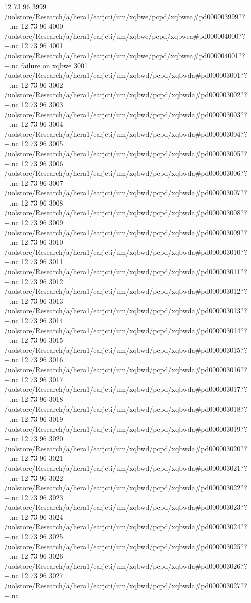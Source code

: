 12 73 96
3999
/uolstore/Research/a/hera1/earjcti/um/xqbwe/pcpd/xqbwea#pd000003999??+.nc
12 73 96
4000
/uolstore/Research/a/hera1/earjcti/um/xqbwe/pcpd/xqbwea#pd000004000??+.nc
12 73 96
4001
/uolstore/Research/a/hera1/earjcti/um/xqbwe/pcpd/xqbwea#pd000004001??+.nc
failure on xqbwe
3001
/uolstore/Research/a/hera1/earjcti/um/xqbwd/pcpd/xqbwda#pd000003001??+.nc
12 73 96
3002
/uolstore/Research/a/hera1/earjcti/um/xqbwd/pcpd/xqbwda#pd000003002??+.nc
12 73 96
3003
/uolstore/Research/a/hera1/earjcti/um/xqbwd/pcpd/xqbwda#pd000003003??+.nc
12 73 96
3004
/uolstore/Research/a/hera1/earjcti/um/xqbwd/pcpd/xqbwda#pd000003004??+.nc
12 73 96
3005
/uolstore/Research/a/hera1/earjcti/um/xqbwd/pcpd/xqbwda#pd000003005??+.nc
12 73 96
3006
/uolstore/Research/a/hera1/earjcti/um/xqbwd/pcpd/xqbwda#pd000003006??+.nc
12 73 96
3007
/uolstore/Research/a/hera1/earjcti/um/xqbwd/pcpd/xqbwda#pd000003007??+.nc
12 73 96
3008
/uolstore/Research/a/hera1/earjcti/um/xqbwd/pcpd/xqbwda#pd000003008??+.nc
12 73 96
3009
/uolstore/Research/a/hera1/earjcti/um/xqbwd/pcpd/xqbwda#pd000003009??+.nc
12 73 96
3010
/uolstore/Research/a/hera1/earjcti/um/xqbwd/pcpd/xqbwda#pd000003010??+.nc
12 73 96
3011
/uolstore/Research/a/hera1/earjcti/um/xqbwd/pcpd/xqbwda#pd000003011??+.nc
12 73 96
3012
/uolstore/Research/a/hera1/earjcti/um/xqbwd/pcpd/xqbwda#pd000003012??+.nc
12 73 96
3013
/uolstore/Research/a/hera1/earjcti/um/xqbwd/pcpd/xqbwda#pd000003013??+.nc
12 73 96
3014
/uolstore/Research/a/hera1/earjcti/um/xqbwd/pcpd/xqbwda#pd000003014??+.nc
12 73 96
3015
/uolstore/Research/a/hera1/earjcti/um/xqbwd/pcpd/xqbwda#pd000003015??+.nc
12 73 96
3016
/uolstore/Research/a/hera1/earjcti/um/xqbwd/pcpd/xqbwda#pd000003016??+.nc
12 73 96
3017
/uolstore/Research/a/hera1/earjcti/um/xqbwd/pcpd/xqbwda#pd000003017??+.nc
12 73 96
3018
/uolstore/Research/a/hera1/earjcti/um/xqbwd/pcpd/xqbwda#pd000003018??+.nc
12 73 96
3019
/uolstore/Research/a/hera1/earjcti/um/xqbwd/pcpd/xqbwda#pd000003019??+.nc
12 73 96
3020
/uolstore/Research/a/hera1/earjcti/um/xqbwd/pcpd/xqbwda#pd000003020??+.nc
12 73 96
3021
/uolstore/Research/a/hera1/earjcti/um/xqbwd/pcpd/xqbwda#pd000003021??+.nc
12 73 96
3022
/uolstore/Research/a/hera1/earjcti/um/xqbwd/pcpd/xqbwda#pd000003022??+.nc
12 73 96
3023
/uolstore/Research/a/hera1/earjcti/um/xqbwd/pcpd/xqbwda#pd000003023??+.nc
12 73 96
3024
/uolstore/Research/a/hera1/earjcti/um/xqbwd/pcpd/xqbwda#pd000003024??+.nc
12 73 96
3025
/uolstore/Research/a/hera1/earjcti/um/xqbwd/pcpd/xqbwda#pd000003025??+.nc
12 73 96
3026
/uolstore/Research/a/hera1/earjcti/um/xqbwd/pcpd/xqbwda#pd000003026??+.nc
12 73 96
3027
/uolstore/Research/a/hera1/earjcti/um/xqbwd/pcpd/xqbwda#pd000003027??+.nc
